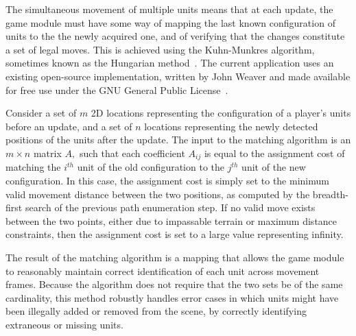 \documentclass{thesis}
\begin{document}
The simultaneous movement of multiple units means that at each update, the game module must have some way of mapping the last known configuration of units to the the newly acquired one, and of verifying that the changes constitute a set of legal moves. This is achieved using the Kuhn-Munkres algorithm, sometimes known as the Hungarian method~\cite{Kuhn1955 , Munkres1957}. The current application uses an existing open-source implementation, written by John Weaver and made available for free use under the GNU General Public License~\cite{MunkresCode}.

Consider a set of \begin{math}m\end{math} 2D locations representing the configuration of a player's units before an update, and a set of \begin{math}n\end{math} locations representing the newly detected positions of the units after the update. The input to the matching algorithm is an \begin{math}m \times n\end{math} matrix \begin{math}A, \end{math} such that each coefficient \begin{math}A_{ij}\end{math} is equal to the assignment cost of matching the \begin{math} i^{th} \end{math} unit of the old configuration to the \begin{math} j^{th} \end{math} unit of the new configuration. In this case, the assignment cost is simply set to the minimum valid movement distance between the two positions, as computed by the breadth-first search of the previous path enumeration step. If no valid move exists between the two points, either due to impassable terrain or maximum distance constraints, then the assignment cost is set to a large value representing infinity.

The result of the matching algorithm is a mapping that allows the game module to reasonably maintain correct identification of each unit across movement frames. Because the algorithm does not require that the two sets be of the same cardinality, this method robustly handles error cases in which units might have been illegally added or removed from the scene, by correctly identifying extraneous or missing units.
\end{document}
